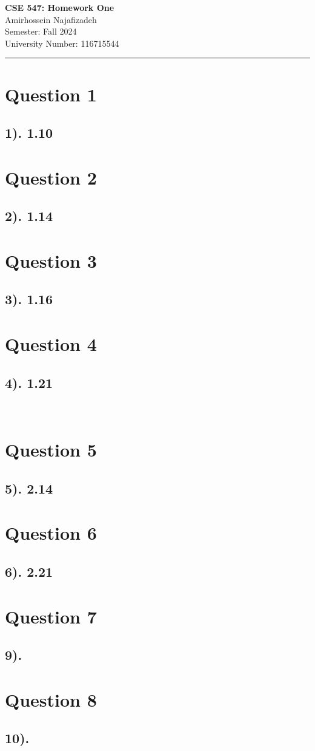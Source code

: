 \documentclass[12pt]{article}
\begin{document}
\begin{center}
    {\LARGE\textbf{CSE 547: Homework One}} \\[1em]
    {\large Amirhossein Najafizadeh} \\[1em]
    Semester: Fall 2024 \\ 
    University Number: 116715544 \\[1em]
    \noindent\rule{\textwidth}{0.6pt}
\end{center}

\section*{Question 1}
\subsection*{1). 1.10}

\section*{Question 2}
\subsection*{2). 1.14}

\section*{Question 3}
\subsection*{3). 1.16}

\section*{Question 4}
\subsection*{4). 1.21}
\
\section*{Question 5}
\subsection*{5). 2.14}

\section*{Question 6}
\subsection*{6). 2.21}

\section*{Question 7}
\subsection*{9).}

\section*{Question 8}
\subsection*{10).}
\end{document}
